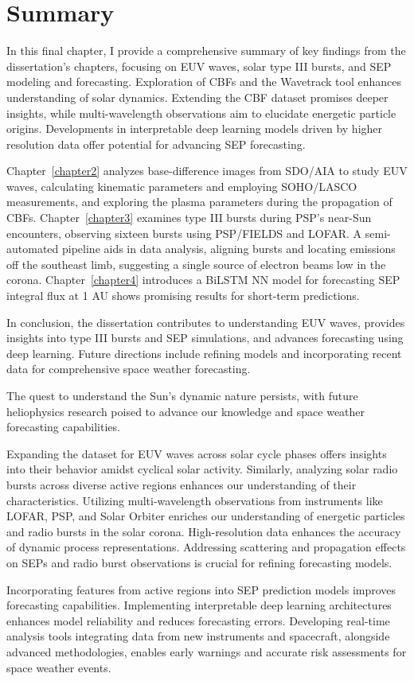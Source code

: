 \chapter{Summary}
\label{chapter5}
In this final chapter, I provide a comprehensive summary of key findings from the dissertation's chapters, focusing on EUV waves, solar type III bursts, and SEP modeling and forecasting. Exploration of CBFs and the Wavetrack tool enhances understanding of solar dynamics. Extending the CBF dataset promises deeper insights, while multi-wavelength observations aim to elucidate energetic particle origins. Developments in interpretable deep learning models driven by higher resolution data offer potential for advancing SEP forecasting.

Chapter~\ref{chapter2} analyzes base-difference images from SDO/AIA to study EUV waves, calculating kinematic parameters and employing SOHO/LASCO measurements, and exploring the plasma parameters during the propagation of CBFs.
Chapter~\ref{chapter3} examines type III bursts during PSP's near-Sun encounters, observing sixteen bursts using PSP/FIELDS and LOFAR. A semi-automated pipeline aids in data analysis, aligning bursts and locating emissions off the southeast limb, suggesting a single source of electron beams low in the corona. 
Chapter~\ref{chapter4} introduces a BiLSTM NN model for forecasting SEP integral flux at 1 AU shows promising results for short-term predictions.

In conclusion, the dissertation contributes to understanding EUV waves, provides insights into type III bursts and SEP simulations, and advances forecasting using deep learning. Future directions include refining models and incorporating recent data for comprehensive space weather forecasting.

The quest to understand the Sun's dynamic nature persists, with future heliophysics research poised to advance our knowledge and space weather forecasting capabilities.

Expanding the dataset for EUV waves across solar cycle phases offers insights into their behavior amidst cyclical solar activity. Similarly, analyzing solar radio bursts across diverse active regions enhances our understanding of their characteristics.
Utilizing multi-wavelength observations from instruments like LOFAR, PSP, and Solar Orbiter enriches our understanding of energetic particles and radio bursts in the solar corona. High-resolution data enhances the accuracy of dynamic process representations.
Addressing scattering and propagation effects on SEPs and radio burst observations is crucial for refining forecasting models.

Incorporating features from active regions into SEP prediction models improves forecasting capabilities. Implementing interpretable deep learning architectures enhances model reliability and reduces forecasting errors.
Developing real-time analysis tools integrating data from new instruments and spacecraft, alongside advanced methodologies, enables early warnings and accurate risk assessments for space weather events.